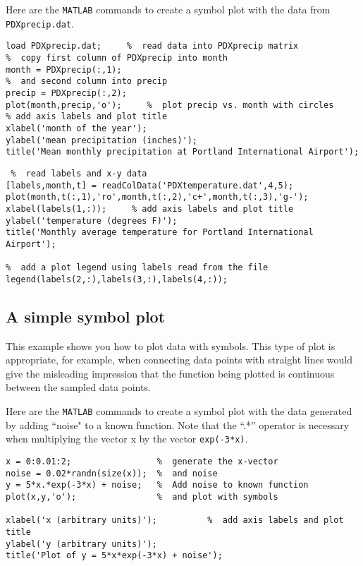 \documentclass[12pt]{article}
\begin{document}
Here are the \texttt{MATLAB} commands to create a symbol plot with the data from \texttt{PDXprecip.dat}.

\begin{framed}
\begin{verbatim}
load PDXprecip.dat;     %  read data into PDXprecip matrix
%  copy first column of PDXprecip into month
month = PDXprecip(:,1);
%  and second column into precip
precip = PDXprecip(:,2);
plot(month,precip,'o');     %  plot precip vs. month with circles
% add axis labels and plot title
xlabel('month of the year');
ylabel('mean precipitation (inches)');
title('Mean monthly precipitation at Portland International Airport');
\end{verbatim}
\end{framed}


\begin{framed}
\begin{verbatim}
 %  read labels and x-y data
[labels,month,t] = readColData('PDXtemperature.dat',4,5);
plot(month,t(:,1),'ro',month,t(:,2),'c+',month,t(:,3),'g-');
xlabel(labels(1,:));     % add axis labels and plot title
ylabel('temperature (degrees F)');
title('Monthly average temperature for Portland International Airport');

%  add a plot legend using labels read from the file
legend(labels(2,:),labels(3,:),labels(4,:));
\end{verbatim}
\end{framed}
\subsection{A simple symbol plot}

This example shows you how to plot data with symbols. This type of plot is appropriate, for example, when connecting data points with straight lines would give the misleading impression that the function being plotted is continuous between the sampled data points.

Here are the \texttt{MATLAB} commands to create a symbol plot with the data generated by adding ``noise" to a known function.
Note that the ``.*'' operator is necessary when multiplying the vector x by the vector \texttt{exp(-3*x)}.

\begin{framed}
\begin{verbatim}
x = 0:0.01:2;                 %  generate the x-vector
noise = 0.02*randn(size(x));  %  and noise
y = 5*x.*exp(-3*x) + noise;   %  Add noise to known function
plot(x,y,'o');                %  and plot with symbols

xlabel('x (arbitrary units)');          %  add axis labels and plot title
ylabel('y (arbitrary units)');
title('Plot of y = 5*x*exp(-3*x) + noise');
\end{verbatim}
\end{framed}
\newpage
\end{document}

